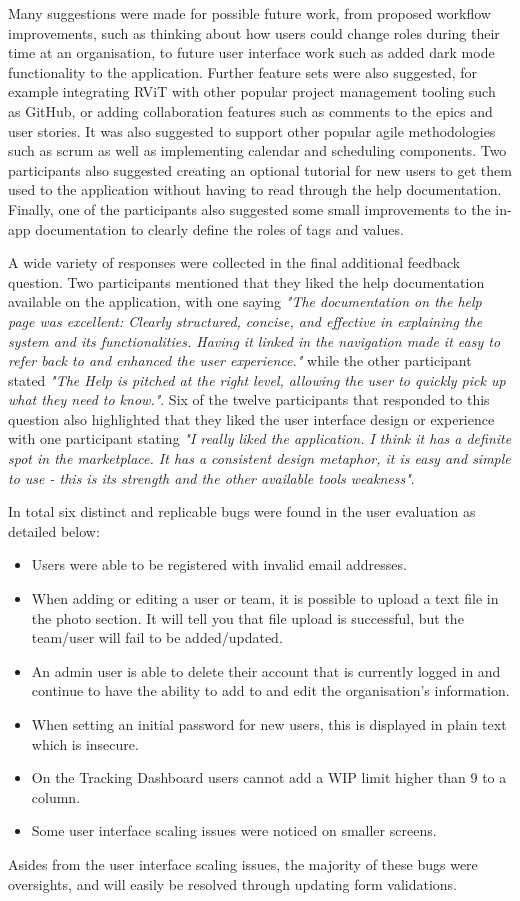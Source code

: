\documentclass[l4proj.tex]{subfiles}
\begin{document}
Many suggestions were made for possible future work, from proposed workflow improvements, such as thinking about how users could change roles during their time at an organisation, to future user interface work such as added dark mode functionality to the application. Further feature sets were also suggested, for example integrating RViT with other popular project management tooling such as GitHub, or adding collaboration features such as comments to the epics and user stories. It was also suggested to support other popular agile methodologies such as scrum as well as implementing calendar and scheduling components. Two participants also suggested creating an optional tutorial for new users to get them used to the application without having to read through the help documentation. Finally, one of the participants also suggested some small improvements to the in-app documentation to clearly define the roles of tags and values.

A wide variety of responses were collected in the final additional feedback question. Two participants mentioned that they liked the help documentation available on the application, with one saying \textit{"The documentation on the help page was excellent: Clearly structured, concise, and effective in explaining the system and its functionalities. Having it linked in the navigation made it easy to refer back to and enhanced the user experience."} while the other participant stated \textit{"The Help is pitched at the right level, allowing the user to quickly pick up what they need to know."}. Six of the twelve participants that responded to this question also highlighted that they liked the user interface design or experience with one participant stating \textit{"I really liked the application. I think it has a definite spot in the marketplace. It has a consistent design metaphor, it is easy and simple to use - this is its strength and the other available tools weakness"}. 


In total six distinct and replicable bugs were found in the user evaluation as detailed below:
\begin{itemize}
    \item Users were able to be registered with invalid email addresses.
    \item When adding or editing a user or team, it is possible to upload a text file in the photo section. It will tell you that file upload is successful, but the team/user will fail to be added/updated.
    \item An admin user is able to delete their account that is currently logged in and continue to have the ability to add to and edit the organisation's information.
    \item When setting an initial password for new users, this is displayed in plain text which is insecure.
    \item On the Tracking Dashboard users cannot add a WIP limit higher than 9 to a column.
    \item Some user interface scaling issues were noticed on smaller screens.
\end{itemize}
Asides from the user interface scaling issues, the majority of these bugs were oversights, and will easily be resolved through updating form validations. 
\end{document}
